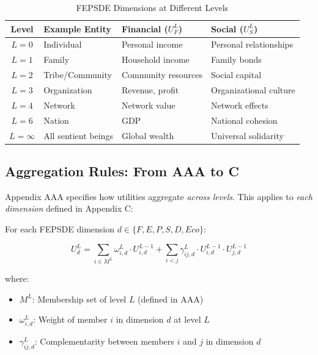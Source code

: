 \begin{table}[htbp]
\centering
\caption{FEPSDE Dimensions at Different Levels}
\label{tab:app-c-level-dimension}
\renewcommand{\arraystretch}{1.3}
\small
\begin{tabular}{@{}clll@{}}
\toprule
\textbf{Level} & \textbf{Example Entity} & \textbf{Financial ($U^L_F$)} & \textbf{Social ($U^L_S$)} \\
\midrule
$L = 0$ & Individual & Personal income & Personal relationships \\
$L = 1$ & Family & Household income & Family bonds \\
$L = 2$ & Tribe/Community & Community resources & Social capital \\
$L = 3$ & Organization & Revenue, profit & Organizational culture \\
$L = 4$ & Network & Network value & Network effects \\
$L = 6$ & Nation & GDP & National cohesion \\
$L = \infty$ & All sentient beings & Global wealth & Universal solidarity \\
\bottomrule
\end{tabular}
\end{table}

\subsection{Aggregation Rules: From AAA to C}

Appendix AAA specifies how utilities aggregate \textit{across levels}. This applies 
to \textit{each dimension} defined in Appendix C:

\begin{tcolorbox}[colback=green!5!white, colframe=green!75!black, 
    title=Dimension-Specific Aggregation (from AAA Axiom AL-3)]
For each FEPSDE dimension $d \in \{F, E, P, S, D, Eco\}$:

\begin{equation}
U^L_d = \sum_{i \in M^L} \omega^L_{i,d} \cdot U^{L-1}_{i,d} + \sum_{i < j} \gamma^L_{ij,d} \cdot U^{L-1}_{i,d} \cdot U^{L-1}_{j,d}
\end{equation}

where:
\begin{itemize}[nosep]
\item $M^L$: Membership set of level $L$ (defined in AAA)
\item $\omega^L_{i,d}$: Weight of member $i$ in dimension $d$ at level $L$
\item $\gamma^L_{ij,d}$: Complementarity between members $i$ and $j$ in dimension $d$
\end{itemize}
\end{tcolorbox}

